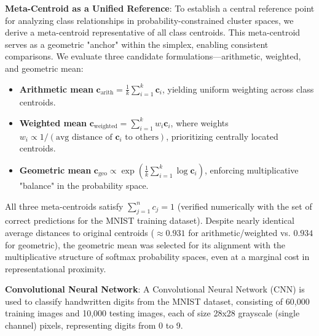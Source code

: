 \textbf{Meta-Centroid as a Unified Reference}:
To establish a central reference point for analyzing class relationships in probability-constrained cluster spaces, we derive a meta-centroid representative of all class centroids. This meta-centroid serves as a geometric "anchor" within the simplex, enabling consistent comparisons. We evaluate three candidate formulations—arithmetic, weighted, and geometric mean:  
\begin{itemize}  
\item \textbf{Arithmetic mean} \( \mathbf{c}_{\text{arith}} = \frac{1}{k} \sum_{i=1}^k \mathbf{c}_i \), yielding uniform weighting across class centroids.  
\item \textbf{Weighted mean} \( \mathbf{c}_{\text{weighted}} = \sum_{i=1}^k w_i \mathbf{c}_i \), where weights \( w_i \propto 1 / (\text{avg distance of } \mathbf{c}_i \text{ to others}) \), prioritizing centrally located centroids.  
\item \textbf{Geometric mean} \( \mathbf{c}_{\text{geo}} \propto \exp\left(\frac{1}{k} \sum_{i=1}^k \log \mathbf{c}_i \right) \), enforcing multiplicative "balance" in the probability space.  
\end{itemize}  

All three meta-centroids satisfy \( \sum_{j=1}^n c_j = 1 \) (verified numerically with the set of correct predictions for the MNIST training dataset). Despite nearly identical average distances to original centroids (\( \approx 0.931 \) for arithmetic/weighted vs. \( 0.934 \) for geometric), the geometric mean was selected for its alignment with the multiplicative structure of softmax probability spaces, even at a marginal cost in representational proximity.



\textbf{Convolutional Neural Network}: A Convolutional Neural Network (CNN) is used to classify handwritten digits from the MNIST dataset, consisting of 60,000 training images and 10,000 testing images, each of size 28x28 grayscale (single channel) pixels, representing digits from 0 to 9.

